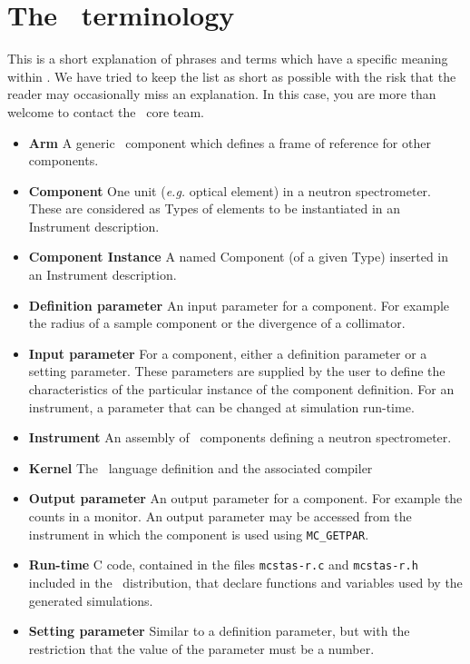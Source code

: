 
\chapter{The \MCX\ terminology}
\label{s:terminology}

This is a short explanation of phrases and terms which have a specific
meaning within \MCX. We have tried to keep the list as short
as possible with the risk that the reader may occasionally miss
an explanation. In this case, you are more than welcome to contact
the \MCX\ core team.

\noindent
\begin{itemize}
\item{\bf Arm}  A generic \MCX\ component which defines a frame of reference
      for other components.
\item{\bf Component} One unit ({\em e.g.} optical element) in a neutron
      spectrometer. These are considered as Types of elements to be instantiated in an Instrument description.
\item{\bf Component Instance} A named Component (of a given Type) inserted in an Instrument description.
\item{\bf Definition parameter} An input parameter for a component. For
  example the radius of a sample component or the divergence of a collimator.
\item{\bf Input parameter} For a component, either a definition parameter
or a setting parameter. These parameters are supplied by the user to
define the characteristics of the particular instance of the component
definition. For an instrument, a parameter that can be changed at
simulation run-time.
\item{\bf Instrument} An assembly of \MCX\ components defining
      a neutron spectrometer.
\item{\bf Kernel} The \MCX\ language definition and the associated compiler
\item{\bf Output parameter} An output parameter for a component.
  For example the counts in a monitor. An output parameter may be
  accessed from the instrument in which the component is used using
  \verb`MC_GETPAR`.
\item{\bf Run-time} C code, contained in the files
  \verb+mcstas-r.c+ and \verb+mcstas-r.h+ included in the \MCX\
  distribution, that declare functions and variables used by the
  generated simulations.
\item{\bf Setting parameter} Similar to a definition parameter, but with the
  restriction that the value of the parameter must be a number.
\end{itemize}
